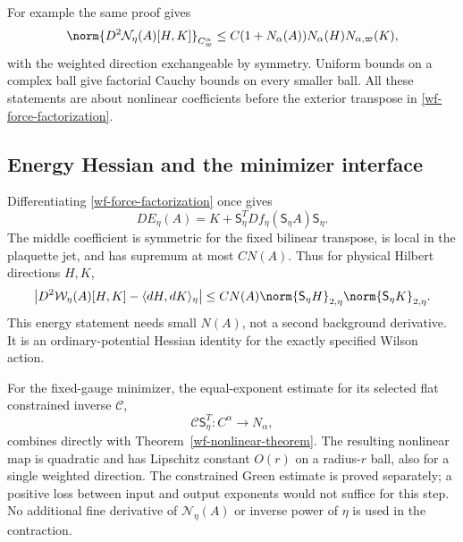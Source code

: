 For example the same proof gives
\begin{equation}\label{wf-second-directional}
 \norm{D^2\mathcal N_\eta(A)[H,K]}_{C^\alpha_\varpi}
 \le C(1+N_\alpha(A))N_\alpha(H)N_{\alpha,\varpi}(K),
\end{equation}
with the weighted direction exchangeable by symmetry.
Uniform bounds on a complex ball give factorial Cauchy
bounds on every smaller ball. All these statements are
about nonlinear coefficients before the exterior
transpose in \eqref{wf-force-factorization}.

\subsection{Energy Hessian and the minimizer interface}

Differentiating \eqref{wf-force-factorization} once gives
\begin{equation}\label{wf-energy-Hessian}
 DE_\eta(A)=K+\mathsf S_\eta^T
                Df_\eta(\mathsf S_\eta A)\mathsf S_\eta.
\end{equation}
The middle coefficient is symmetric for the fixed bilinear
transpose, is local in the plaquette jet, and has supremum
at most $CN(A)$. Thus for physical Hilbert directions $H,K$,
\begin{equation}\label{wf-energy-form}
 \left|D^2\mathcal W_\eta(A)[H,K]
                         -\langle dH,dK\rangle_\eta\right|
 \le CN(A)\norm{\mathsf S_\eta H}_{2,\eta}
                         \norm{\mathsf S_\eta K}_{2,\eta}.
\end{equation}
This energy statement needs small $N(A)$, not a second
background derivative. It is an ordinary-potential
Hessian identity for the exactly specified Wilson action.

For the fixed-gauge minimizer, the equal-exponent estimate
for its selected flat constrained inverse $\mathcal C$,
\[
 \mathcal C\mathsf S_\eta^T:C^\alpha\longrightarrow N_\alpha,
\]
combines directly with Theorem~\ref{wf-nonlinear-theorem}.
The resulting nonlinear map is quadratic and has
Lipschitz constant $O(r)$ on a radius-$r$ ball, also for
a single weighted direction. The constrained Green estimate
is proved separately; a positive loss between input and
output exponents would not suffice for this step. No
additional fine derivative of $\mathcal N_\eta(A)$ or
inverse power of $\eta$ is used in the contraction.
